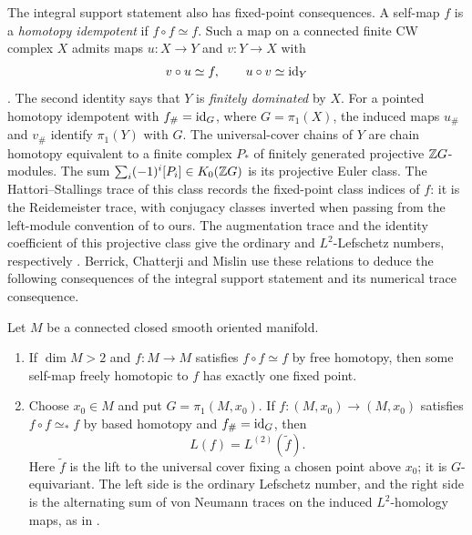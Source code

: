 The integral support statement also has fixed-point consequences.
A self-map $f$ is a \emph{homotopy idempotent} if $f\circ f\simeq f$.
Such a map on a connected finite CW complex $X$ admits maps
$u:X\to Y$ and $v:Y\to X$ with
\[
 v\circ u\simeq f,\qquad u\circ v\simeq\operatorname{id}_Y
\]
\cite[Section 3]{BCM2006}. The second identity says that $Y$ is
\emph{finitely dominated} by $X$. For a pointed homotopy idempotent
with $f_\#=\operatorname{id}_G$, where $G=\pi_1(X)$, the induced maps $u_\#$ and
$v_\#$ identify $\pi_1(Y)$ with $G$. The universal-cover chains of $Y$
are chain homotopy equivalent to a finite complex $P_*$ of finitely
generated projective $\mathbb Z G$-modules. The sum
$\sum_i(-1)^i[P_i]\in K_0(\mathbb Z G)$ is its projective Euler class. The
Hattori--Stallings trace of this class records the fixed-point class indices of $f$:
it is the Reidemeister trace, with conjugacy classes inverted when
passing from the left-module convention of \cite[Lemma 4.1]{BCM2006}
to ours. The augmentation trace and the identity coefficient of this projective
class give the ordinary and $L^2$-Lefschetz numbers, respectively
\cite[Lemmas 8.1--8.2]{BCM2006}. Berrick, Chatterji and Mislin use these
relations to deduce the following consequences of the integral support
statement and its numerical trace consequence.

\begin{corollary}
\label{cor:homotopy-idempotents}
Let $M$ be a connected closed smooth oriented manifold.
\begin{enumerate}[label=\textup{(\roman*)}]
 \item If $\dim M>2$ and $f:M\to M$ satisfies $f\circ f\simeq f$
 by free homotopy, then some self-map freely homotopic to $f$ has
 exactly one fixed point.
 \item Choose $x_0\in M$ and put $G=\pi_1(M,x_0)$. If
 $f:(M,x_0)\to(M,x_0)$ satisfies $f\circ f\simeq_* f$ by based
 homotopy and $f_\#=\operatorname{id}_G$, then
 \[
  L(f)=L^{(2)}(\widetilde f).
 \]
 Here $\widetilde f$ is the lift to the universal cover fixing a chosen
 point above $x_0$; it is $G$-equivariant. The left side is the ordinary
 Lefschetz number, and the right side is the alternating sum of von
 Neumann traces on the induced $L^2$-homology maps, as in
 \cite[Definition 7.1]{BCM2006}.
\end{enumerate}
\end{corollary}

